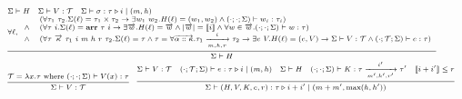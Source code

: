 \documentclass[fleqn]{article}
\begin{document}
\[
\scriptsize
\begin{array}{l}
	\Sigma \vdash H \hspace{1em} \Sigma \vdash V : \mathcal{T} \hspace{1em} \Sigma \vdash \sigma : \tau \triangleright i \mid (m, h) \\
	\infer{\Sigma \vdash H}{\forall \ell, \begin{array}{cl} & (\forall \tau_1~\tau_2. \Sigma(\ell) = \tau_1 \times \tau_2 \rightarrow \exists w_1~w_2. H(\ell) = (w_1,w_2) \land (\cdot;\cdot;\Sigma) \vdash w_i : \tau_i ) \\ \land & (\forall \tau~i. \Sigma(\ell)= \mathbf{arr}~\tau~i \rightarrow \exists \overrightarrow{w}. H(\ell) = \overrightarrow{w} \land |\overrightarrow{w}| = \llbracket i \rrbracket \land \forall w \in \overrightarrow{w}. (\cdot;\cdot;\Sigma) \vdash w : \tau  ) \\ \land & (\forall \tau~\overrightarrow{\kappa}~\tau_1~i~m~h~r~\tau_2. \Sigma(\ell)=\tau \land \tau=\forall \overrightarrow{\alpha::\kappa}. \tau_1 \xrightarrow[m,h,r]{i} \tau_2 \rightarrow \exists e~V. H(\ell) = (e, V) \rightarrow \Sigma \vdash V : \mathcal{T} \land (\cdot;\mathcal{T};\Sigma) \vdash e : \tau ) \end{array} } \\
	\infer{\Sigma \vdash V : \mathcal{T}}{\mathcal{T} = \lambda x. \tau \mathrm{~where~} (\cdot;\cdot;\Sigma) \vdash V(x) : \tau   } \hspace{1em}
	\infer{\Sigma \vdash (H,V,K,e,r) : \tau \triangleright i + i' \mid (m + m', \max(h, h'))}{\Sigma \vdash V : \mathcal{T} & (\cdot;\mathcal{T};\Sigma) \vdash e : \tau \triangleright i \mid (m,h) & \Sigma \vdash H & (\cdot; \cdot; \Sigma) \vdash K : \tau \xrightarrow[m',h',r']{i'} \tau' & \llbracket i + i' \rrbracket \le r}
\end{array}
\]
\end{document}
